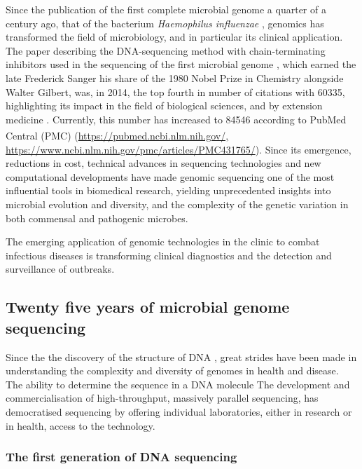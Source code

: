 Since the publication of the first complete microbial genome a quarter of a century ago, that of the bacterium \textit{Haemophilus influenzae} \citep{hood_dna_1996}, genomics has transformed the field of microbiology, and in particular its clinical application. The paper describing the DNA-sequencing method with chain-terminating inhibitors used in the sequencing of the first microbial genome \citep{sanger_dna_1977}, which earned the late Frederick Sanger his share of the 1980 Nobel Prize in Chemistry alongside Walter Gilbert, was, in 2014, the top fourth in number of citations with 60335, highlighting its impact in the field of biological sciences, and by extension medicine \citep{van_noorden_top_2014}. Currently, this number has increased to 84546 according to PubMed Central\textsuperscript{\small\textregistered} (PMC) (\url{https://pubmed.ncbi.nlm.nih.gov/, https://www.ncbi.nlm.nih.gov/pmc/articles/PMC431765/}). Since its emergence, reductions in cost, technical advances in sequencing technologies and new computational developments have made genomic sequencing one of the most influential tools in biomedical research, yielding unprecedented insights into microbial evolution and diversity, and the complexity of the genetic variation in both commensal and pathogenic microbes. 

The emerging application of genomic technologies in the clinic to combat infectious diseases is transforming clinical diagnostics and the detection and surveillance of outbreaks. 

\subsection{Twenty five years of microbial genome sequencing} \label{ssec:sequencing}

Since the  the discovery of the structure of DNA \citep{watson_molecular_1953}, great strides have been made in understanding the complexity and diversity of genomes in health and disease. The ability to determine the sequence in a DNA molecule  
The development and commercialisation of high-throughput, massively parallel sequencing, has democratised sequencing by offering individual laboratories, either in research or in health, access to the technology.

\subsubsection{The first generation of DNA sequencing} \label{ssec:1st_gen_seq}

